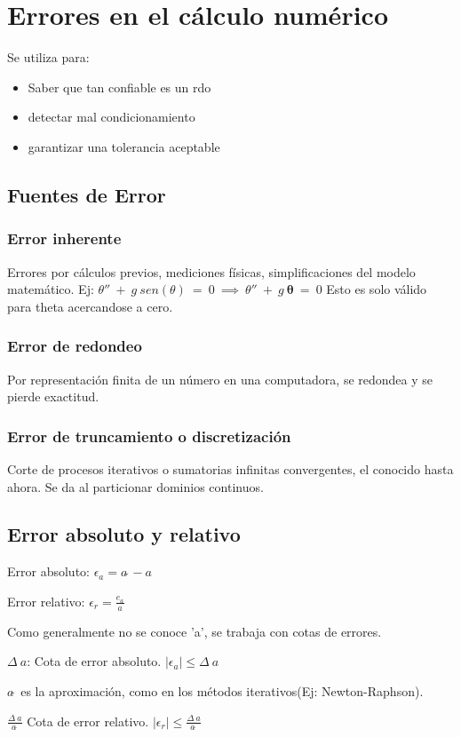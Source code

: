 \section{Errores en el cálculo numérico}
Se utiliza para:
\begin{itemize}
    \item Saber que tan confiable es un rdo
    \item detectar mal condicionamiento
    \item garantizar una tolerancia aceptable
\end{itemize}

\subsection{Fuentes de Error}
\subsubsection{Error inherente}
Errores por cálculos previos, mediciones físicas, simplificaciones del modelo matemático.
Ej: $\theta''\ +\ g\ sen\left(\theta\right)\ = \ 0\ \implies\ \theta''\ +\ g\ \boldsymbol{\theta}\ =\ 0$
Esto es solo válido para theta acercandose a cero.
\subsubsection{Error de redondeo}
Por representación finita de un número en una computadora, se redondea y se pierde exactitud.
\subsubsection{Error de truncamiento o discretización}
Corte de procesos iterativos o sumatorias infinitas convergentes, el conocido hasta ahora.
Se da al particionar dominios continuos.
\subsection{Error absoluto y relativo}
Error absoluto: $\epsilon_a=a\tilde{~}-a$


Error relativo: $\epsilon_r=\frac{e_a}{a}$


Como generalmente no se conoce 'a', se trabaja con cotas de errores.


$\Delta\ a$: Cota de error absoluto. $|\epsilon_a|\le\Delta\ a$

${a\tilde{~}}$ es la aproximación, como en los métodos iterativos(Ej: Newton-Raphson).

$\frac{\Delta\ a}{a\tilde{~}}$ Cota de error relativo. $|\epsilon_r|\le \frac{\Delta\ a}{a\tilde{~}}$

